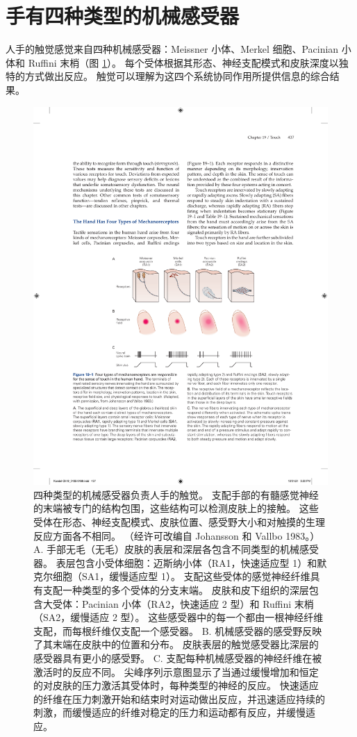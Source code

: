 \section{手有四种类型的机械感受器}
人手的触觉感觉来自四种机械感受器：Meissner 小体、Merkel 细胞、Pacinian 小体和 Ruffini 末梢（图 \ref{fig:19_1}）。 
每个受体根据其形态、神经支配模式和皮肤深度以独特的方式做出反应。 
触觉可以理解为这四个系统协同作用所提供信息的综合结果。

\begin{figure}[htbp]
	\centering
	\includegraphics[width=1.0\linewidth]{chap19/fig_19_1}
	\caption{四种类型的机械感受器负责人手的触觉。 
		支配手部的有髓感觉神经的末端被专门的结构包围，这些结构可以检测皮肤上的接触。 
		这些受体在形态、神经支配模式、皮肤位置、感受野大小和对触摸的生理反应方面各不相同。 （经许可改编自 Johansson 和 Vallbo 1983。） 
		A. 手部无毛（无毛）皮肤的表层和深层各包含不同类型的机械感受器。 
		表层包含小受体细胞：迈斯纳小体（RA1，快速适应型 1）和默克尔细胞（SA1，缓慢适应型 1）。 
		支配这些受体的感觉神经纤维具有支配一种类型的多个受体的分支末端。 
		皮肤和皮下组织的深层包含大受体：Pacinian 小体（RA2，快速适应 2 型）和 Ruffini 末梢（SA2，缓慢适应 2 型）。 
		这些感受器中的每一个都由一根神经纤维支配，而每根纤维仅支配一个感受器。 
		B. 机械感受器的感受野反映了其末端在皮肤中的位置和分布。 
		皮肤表层的触觉感受器比深层的感受器具有更小的感受野。 
		C. 支配每种机械感受器的神经纤维在被激活时的反应不同。 
		尖峰序列示意图显示了当通过缓慢增加和恒定的对皮肤的压力激活其受体时，每种类型的神经的反应。 
		快速适应的纤维在压力刺激开始和结束时对运动做出反应，并迅速适应持续的刺激，而缓慢适应的纤维对稳定的压力和运动都有反应，并缓慢适应。}
	\label{fig:19_1}
\end{figure}


